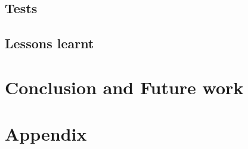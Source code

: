 \documentclass[a4paper,twocolumn]{article}
\begin{document}
\subsection{Tests}

\subsection{Lessons learnt}

\section{Conclusion and Future work}

\section{Appendix} %
\end{document}
